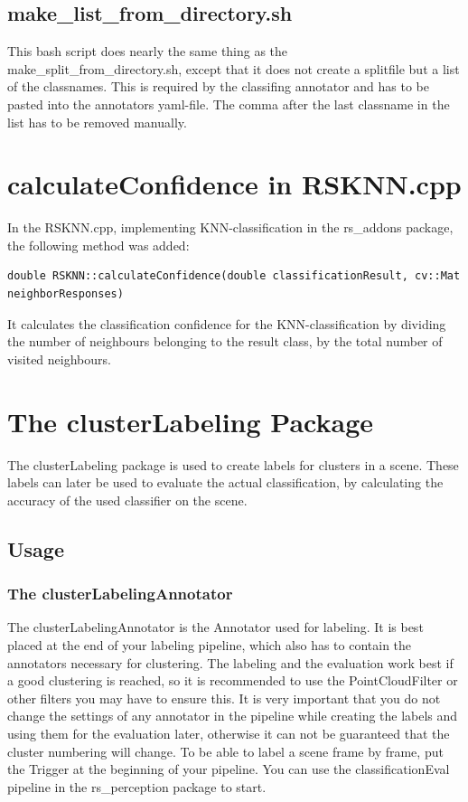 \documentclass[main.tex]{subfiles}
\begin{document}
\subsection{make\_list\_from\_directory.sh}
This bash script does nearly the same thing as the make\_split\_from\_directory.sh, except that it does not create a splitfile but a list of the classnames. This is required by the classifing annotator and has to be pasted into the annotators yaml-file. The comma after the last classname in the list has to be removed manually.

\section{calculateConfidence in RSKNN.cpp}
In the RSKNN.cpp, implementing KNN-classification in the rs\_addons package, the following method was added:

\begin{lstlisting}
double RSKNN::calculateConfidence(double classificationResult, cv::Mat neighborResponses)
\end{lstlisting}

It calculates the classification confidence for the KNN-classification by dividing the number of neighbours belonging to the result class, by the total number of visited neighbours. 

\section{The clusterLabeling Package}
The clusterLabeling package is used to create labels for clusters in a scene. These labels can later be used to evaluate the actual classification, by calculating the accuracy of the used classifier on the scene.

\subsection{Usage}

\subsubsection{The clusterLabelingAnnotator}
The clusterLabelingAnnotator is the Annotator used for labeling. It is best placed at the end of your labeling pipeline, which also has to contain the annotators necessary for clustering. The labeling and the evaluation work best if a good clustering is reached, so it is recommended to use the PointCloudFilter or other filters you may have to ensure this. It is very important that you do not change the settings of any annotator in the pipeline while creating the labels and using them for the evaluation later, otherwise it can not be guaranteed that the cluster numbering will change. To be able to label a scene frame by frame, put the Trigger at the beginning of your pipeline. You can use the classificationEval pipeline in the rs\_perception package to start.\\
\end{document}
